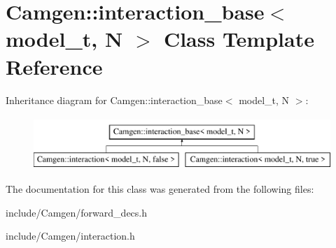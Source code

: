 \hypertarget{a00312}{\section{Camgen\-:\-:interaction\-\_\-base$<$ model\-\_\-t, N $>$ Class Template Reference}
\label{a00312}
}
Inheritance diagram for Camgen\-:\-:interaction\-\_\-base$<$ model\-\_\-t, N $>$\-:\begin{figure}[H]
\begin{center}
\leavevmode
\includegraphics[height=2.000000cm]{a00312}
\end{center}
\end{figure}


The documentation for this class was generated from the following files\-:\begin{DoxyCompactItemize}
\item 
include/\-Camgen/forward\-\_\-decs.\-h\item 
include/\-Camgen/interaction.\-h\end{DoxyCompactItemize}
